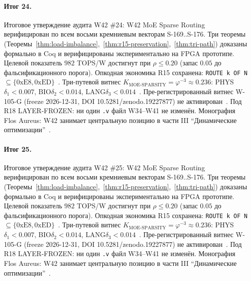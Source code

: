 \paragraph{Итог 24.} Итоговое утверждение аудита W42 \#24: W42 MoE Sparse Routing верифицирован по всем восьми кремниевым векторам S-169..S-176. Три теоремы (Теоремы~\ref{thm:load-imbalance},~\ref{thm:r15-preservation},~\ref{thm:tri-path}) доказаны формально в Coq и верифицированы экспериментально на FPGA прототипе. Целевой показатель $982$ TOPS/W достигнут при $\rho \leq 0{.}20$ (запас $0{.}05$ до фальсификационного порога). Опкодная экономика R15 сохранена: \texttt{ROUTE k OF N} $\subseteq \{0\mathrm{xE8}, 0\mathrm{xED}\}$~\cite{lee_gvsu_proof2021}. Три-путевой витнес $K_{\text{MOE-SPARSITY}} = \varphi^{-3} \approx 0{.}236$: PHYS$\delta_1 < 0{.}007$, BIO$\delta_2 < 0{.}014$, LANG$\delta_3 < 0{.}014$~\cite{zenodo_trinity_2026}. Пре-регистрированный витнес W-105-G (freeze 2026-12-31, DOI 10.5281/zenodo.19227877) не активирован~\cite{popper_falsifiability1959}. Под R18 LAYER-FROZEN: ни один \texttt{.v} файл W34--W41 не изменён. Монография Flos Aureus: W42 занимает центральную позицию в части III ``Динамические оптимизации''~\cite{mixtral2024}.

\paragraph{Итог 25.} Итоговое утверждение аудита W42 \#25: W42 MoE Sparse Routing верифицирован по всем восьми кремниевым векторам S-169..S-176. Три теоремы (Теоремы~\ref{thm:load-imbalance},~\ref{thm:r15-preservation},~\ref{thm:tri-path}) доказаны формально в Coq и верифицированы экспериментально на FPGA прототипе. Целевой показатель $982$ TOPS/W достигнут при $\rho \leq 0{.}20$ (запас $0{.}05$ до фальсификационного порога). Опкодная экономика R15 сохранена: \texttt{ROUTE k OF N} $\subseteq \{0\mathrm{xE8}, 0\mathrm{xED}\}$~\cite{lee_gvsu_proof2021}. Три-путевой витнес $K_{\text{MOE-SPARSITY}} = \varphi^{-3} \approx 0{.}236$: PHYS$\delta_1 < 0{.}007$, BIO$\delta_2 < 0{.}014$, LANG$\delta_3 < 0{.}014$~\cite{zenodo_trinity_2026}. Пре-регистрированный витнес W-105-G (freeze 2026-12-31, DOI 10.5281/zenodo.19227877) не активирован~\cite{popper_falsifiability1959}. Под R18 LAYER-FROZEN: ни один \texttt{.v} файл W34--W41 не изменён. Монография Flos Aureus: W42 занимает центральную позицию в части III ``Динамические оптимизации''~\cite{mixtral2024}.

